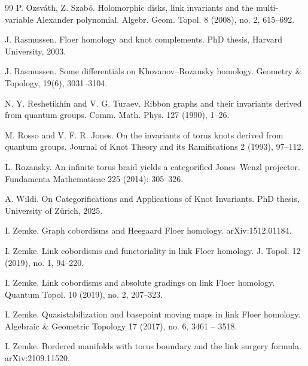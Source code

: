 \documentclass{amsart}
\begin{document}
\begin{thebibliography}{99}
 P. Ozsv\'ath, Z. Szab\'o. Holomorphic disks, link invariants and the multi-variable  Alexander polynomial. Algebr. Geom. Topol. 8 (2008), no. 2, 615--692.

 J. Rasmussen. Floer homology and knot complements. PhD thesis, Harvard University, 2003.



 J. Rasmussen. Some differentials on Khovanov–Rozansky homology. Geometry \& Topology, 19(6), 3031--3104.

  N. Y. Reshetikhin and V. G. Turaev. Ribbon graphs and their invariants derived from
quantum groups. Comm. Math. Phys. 127 (1990), 1--26.

 M. Rosso and V. F. R. Jones. On the invariants of torus knots derived from quantum groups. Journal of Knot Theory and its 
Ramifications 2 (1993), 97--112.

 L. Rozansky. An infinite torus braid yields a categorified Jones--Wenzl projector. Fundamenta Mathematicae 225 (2014): 305--326.

 A. Wildi. On Categorifications and Applications of Knot Invariants. PhD thesis, University of Z\"urich, 2025.


 I. Zemke. Graph cobordisms and Heegaard Floer homology. arXiv:1512.01184.

 I. Zemke. Link cobordisms and functoriality in link Floer homology. J. Topol. 12 (2019), no. 1, 94--220. 

 I. Zemke. Link cobordisms and absolute gradings on link Floer homology. Quantum Topol. 10 (2019), no. 2, 207--323. 

 I. Zemke. Quasistabilization and basepoint moving maps in link Floer homology. Algebraic \& Geometric Topology 17 (2017), no. 6, 3461 -- 3518.

 I. Zemke. Bordered manifolds with torus boundary and the link surgery formula. arXiv:2109.11520.


\end{thebibliography}
\end{document}
